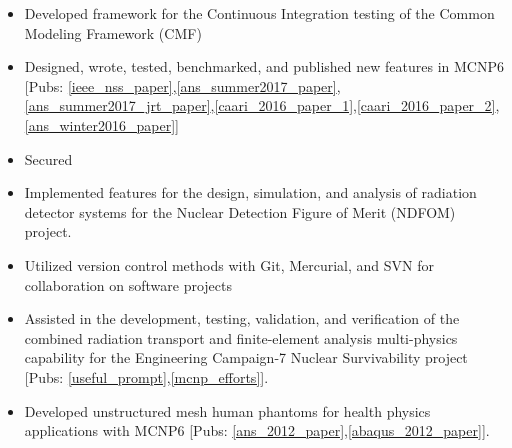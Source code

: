 \begin{minipage}{\textwidth}
	\begin{center}
		\begin{itemize}
			\item Developed framework for the Continuous Integration testing of the Common Modeling Framework (CMF)
			\item Designed, wrote, tested, benchmarked, and published new features in \textsc{MCNP6} [Pubs: \ref{ieee_nss_paper},\ref{ans_summer2017_paper},\ref{ans_summer2017_jrt_paper},\ref{caari_2016_paper_1},\ref{caari_2016_paper_2},\ref{ans_winter2016_paper}]
			\item Secured
			\item Implemented features for the design, simulation, and analysis of radiation detector systems for the Nuclear Detection Figure of Merit (NDFOM) project.
			\item Utilized version control methods with Git, Mercurial, and SVN for collaboration on software projects
	    		\item Assisted in the development, testing, validation, and verification of the combined radiation transport and finite-element analysis multi-physics capability for the Engineering Campaign-7 Nuclear Survivability project [Pubs: \ref{useful_prompt},\ref{mcnp_efforts}].
	    		\item Developed unstructured mesh human phantoms for health physics applications with \textsc{MCNP6} [Pubs: \ref{ans_2012_paper},\ref{abaqus_2012_paper}].

\end{itemize}
\end{center}
\end{minipage}
